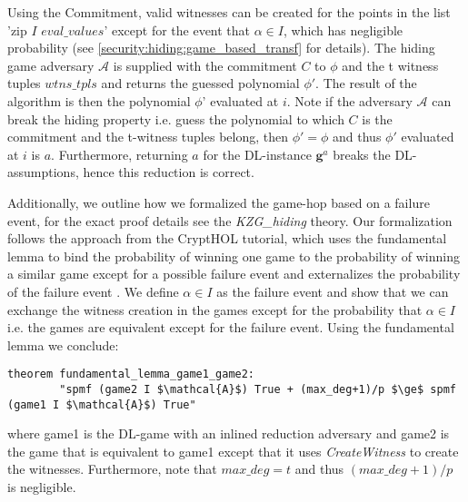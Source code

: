 Using the Commitment, valid witnesses can be created for the points in the list 'zip $I$ $eval\_values$' except for the event that $\alpha\in I$, which has negligible probability (see \ref{security:hiding:game_based_transf} for details).
The hiding game adversary $\mathcal{A}$ is supplied with the commitment $C$ to $\phi$ and the t witness tuples $wtns\_tpls$ and returns the guessed polynomial $\phi'$. The result of the algorithm is then the polynomial $\phi$' evaluated at $i$. Note if the adversary $\mathcal{A}$
can break the hiding property i.e. guess the polynomial to which $C$ is the commitment and the t-witness tuples belong, then $\phi'=\phi$ and thus $\phi'$ evaluated at $i$ is $a$. Furthermore, returning $a$ for the DL-instance $\mathbf{g}^a$ breaks the DL-assumptions, hence this reduction is correct.

Additionally, we outline how we formalized the game-hop based on a failure event, for the exact proof details see the \textit{KZG\_hiding} theory.
Our formalization follows the approach from the CryptHOL tutorial\parencite{CryptHOL_tutorial}, which uses the fundamental lemma to bind the probability of winning one game to the probability of winning a similar game except for a possible failure event and externalizes the probability of the failure event \parencite{CryptHOL_tutorial}. We define $\alpha \in I$ as the failure event and show that we can exchange the witness creation in the games except for the probability that $\alpha\in I$ i.e. the games are equivalent except for the failure event. Using the fundamental lemma we conclude: 
\begin{lstlisting}[language=isabelle]
    theorem fundamental_lemma_game1_game2: 
        "spmf (game2 I $\mathcal{A}$) True + (max_deg+1)/p $\ge$ spmf (game1 I $\mathcal{A}$) True"
\end{lstlisting}
where game1 is the DL-game with an inlined reduction adversary and game2 is the game that is equivalent to game1 except that it uses \textit{CreateWitness} to create the witnesses. Furthermore, note that $max\_deg=t$ and thus $(max\_deg + 1)/p$ is negligible. 


